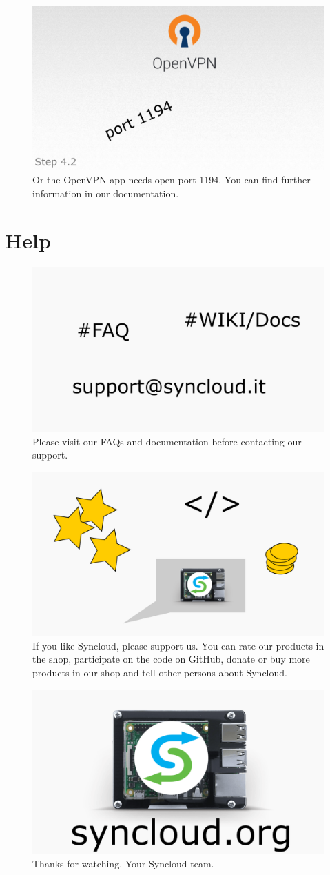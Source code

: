 \documentclass[a4paper,12pt]{article}
\begin{document}
\begin{figure}[htbp!]
	\centering
	\includegraphics[width=0.7\linewidth]{../frames/53.png}
	\caption{Or the OpenVPN app needs open port 1194. You can find further information in our documentation.}
	\label{fig:40}
\end{figure}

\section{Help}

\begin{figure}[htbp!]
	\centering
	\includegraphics[width=0.7\linewidth]{../frames/56.png}
	\caption{Please visit our FAQs and documentation before contacting our support.}
	\label{fig:41}
\end{figure}

\begin{figure}[htbp!]
	\centering
	\includegraphics[width=0.7\linewidth]{../frames/60.png}
	\caption{If you like Syncloud, please support us. You can rate our products in the shop, participate on the code on GitHub, donate or buy more products in our shop and tell other persons about Syncloud.}
	\label{fig:42}
\end{figure}

\begin{figure}[htbp!]
	\centering
	\includegraphics[width=0.7\linewidth]{../frames/61.png}
	\caption{Thanks for watching. Your Syncloud team.}
	\label{fig:43}
\end{figure}
\end{document}
